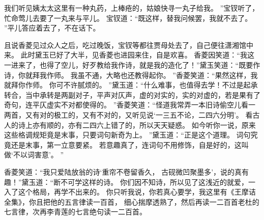 我们听见姨太太这里有一种丸药，上棒疮的，姑娘快寻一丸子给我。
”宝钗听了，忙命莺儿去要了一丸来与平儿。
宝钗道：“既这样，替我问候罢，我就不去了。
”平儿答应着去了，不在话下。
\par
且说香菱见过众人之后，吃过晚饭，宝钗等都往贾母处去了，自己便往潇湘馆中来。
此时黛玉已好了大半，见香菱也进园来住，自是欢喜。
香菱因笑道：“我这一进来了，也得了空儿，好歹教给我作诗，就是我的造化了！”黛玉笑道：“既要作诗，你就拜我作师。
我虽不通，大略也还教得起你。
”香菱笑道：“果然这样，我就拜你作师。
你可不许腻烦的。
”黛玉道：“什么难事，也值得去学！不过是起承转合，当中承转是两副对子，平声对仄声，虚的对实的，实的对虚的，若是果有了奇句，连平仄虚实不对都使得的。
”香菱笑道：“怪道我常弄一本旧诗偷空儿看一两首，又有对的极工的，又有不对的，又听见说‘一三五不论，二四六分明’。
看古人的诗上亦有顺的，亦有二四六上错了的，所以天天疑惑。
如今听你一说，原来这些格调规矩竟是末事，只要词句新奇为上。
”黛玉道：“正是这个道理。
词句究竟还是末事，第一立意要紧。
若意趣真了，连词句不用修饰，自是好的，这叫做‘不以词害意’。
”\par
香菱笑道：“我只爱陆放翁的诗‘重帘不卷留香久，
古砚微凹聚墨多’，说的真有趣！”黛玉道：“断不可学这样的诗。
你们因不知诗，所以见了这浅近的就爱，一入了这个格局，再学不出来的。
你只听我说，你若真心要学，我这里有《王摩诘全集》，你且把他的五言律读一百首，
细心揣摩透熟了，然后再读一二百首老杜的七言律，次再李青莲的七言绝句读一二百首。
